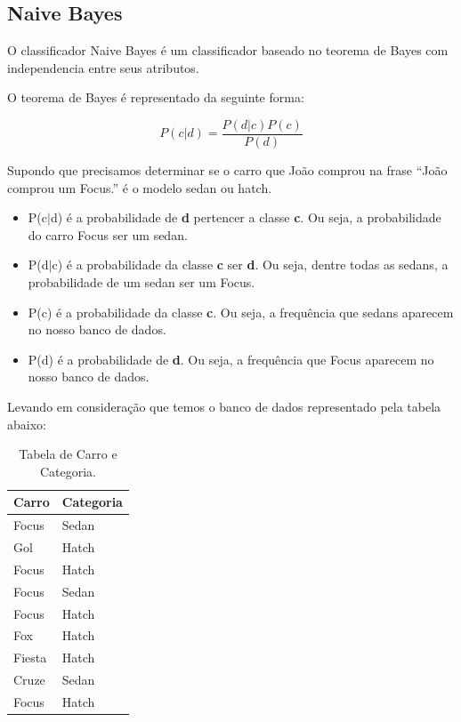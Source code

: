 
\subsection{Naive Bayes}

O classificador Naive Bayes é um classificador baseado no teorema de Bayes com
independencia entre seus atributos.

O teorema de Bayes é representado da seguinte forma:

\[ P(c|d) = \frac{P(d|c) P(c)}{P(d)}  \]

Supondo que precisamos determinar se o carro que João comprou na frase ``João
comprou um Focus.'' é o modelo sedan ou hatch.
 
\begin{itemize}
  \item P(c$\vert$d) é a probabilidade de \textbf{d} pertencer a classe
  \textbf{c}. Ou seja, a probabilidade do carro Focus ser um sedan.
  \item P(d$\vert$c) é a probabilidade da classe \textbf{c} ser \textbf{d}. Ou
  seja, dentre todas as sedans, a probabilidade de um sedan ser
  um Focus.
  \item P(c) é a probabilidade da classe \textbf{c}. Ou seja, a frequência que
  sedans aparecem no nosso banco de dados.
  \item P(d) é a probabilidade de \textbf{d}. Ou seja, a frequência que Focus aparecem no nosso banco de dados.
\end{itemize}

Levando em consideração que temos o banco de dados representado pela tabela
abaixo:

\begin{table}[htb]
\centering
\label{123}
\begin{tabular}{|l|l|}
\hline
Carro  & Categoria \\ \hline
Focus  & Sedan     \\ \hline
Gol    & Hatch     \\ \hline
Focus  & Hatch     \\ \hline
Focus  & Sedan     \\ \hline
Focus  & Hatch     \\ \hline
Fox    & Hatch     \\ \hline
Fiesta & Hatch     \\ \hline
Cruze  & Sedan     \\ \hline
Focus  & Hatch     \\ \hline
\end{tabular} 
\caption{Tabela de Carro e Categoria.}
\end{table}

